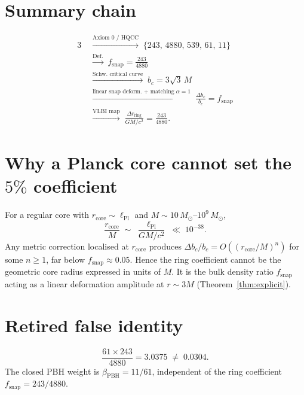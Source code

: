 \section{Summary chain}
\label{sec:summary-chain}

\begin{equation}
\boxed{
\begin{aligned}
3
&\;\xrightarrow{\text{Axiom 0 / HQCC}}\;
\{243,\,4880,\,539,\,61,\,11\}
\\
&\;\xrightarrow{\text{Def.}}\;
f_{\mathrm{snap}}=\frac{243}{4880}
\\
&\;\xrightarrow{\text{Schw.\ critical curve}}\;
b_c=3\sqrt{3}\,M
\\
&\;\xrightarrow{\text{linear snap deform.\ +\ matching }\alpha=1}\;
\frac{\Delta b_c}{b_c}=f_{\mathrm{snap}}
\\
&\;\xrightarrow{\text{VLBI map}}\;
\frac{\Delta r_{\mathrm{ring}}}{GM/c^2}
=\frac{243}{4880}.
\end{aligned}
}
\end{equation}

\appendix
\section{Why a Planck core cannot set the \(5\%\) coefficient}
\label{app:core}

For a regular core with \(r_{\mathrm{core}}\sim\ell_{\mathrm{Pl}}\) and
\(M\sim 10\,M_\odot\)--\(10^{9}\,M_\odot\),
\[
\frac{r_{\mathrm{core}}}{M}
\;\sim\;
\frac{\ell_{\mathrm{Pl}}}{GM/c^2}
\;\ll\;
10^{-38}.
\]
Any metric correction localised at \(r_{\mathrm{core}}\) produces
\(\Delta b_c/b_c=O((r_{\mathrm{core}}/M)^n)\) for some \(n\ge 1\), far below
\(f_{\mathrm{snap}}\approx 0.05\). Hence the ring coefficient cannot be the
geometric core radius expressed in units of \(M\). It is the bulk density
ratio \(f_{\mathrm{snap}}\) acting as a linear deformation amplitude at
\(r\sim 3M\) (Theorem~\ref{thm:explicit}).

\section{Retired false identity}
\label{app:retired}
\[
\frac{61\times 243}{4880}=3.0375
\;\neq\;
0.0304.
\]
The closed PBH weight is \(\beta_{\mathrm{PBH}}=11/61\), independent of the ring
coefficient \(f_{\mathrm{snap}}=243/4880\).

